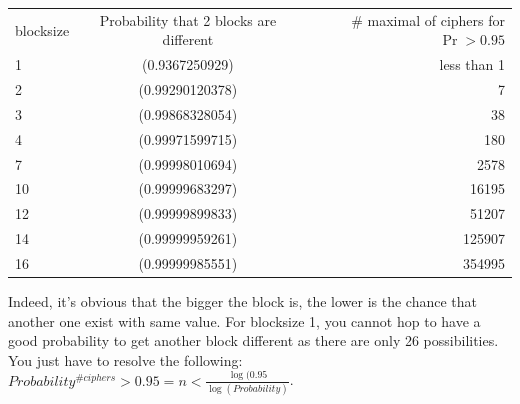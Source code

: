 \documentclass{article}
\begin{document}
\begin{tabular}{|l|c|r|}
  \hline
  blocksize & Probability that 2 blocks are different & \# maximal of ciphers for $\Pr > 0.95$\\
	1 & (0.9367250929) & less than 1\\
	2 & (0.99290120378) & 7\\
	3 & (0.99868328054) & 38\\
	4 & (0.99971599715) & 180\\
	7 & (0.99998010694) & 2578\\
	10 & (0.99999683297) & 16195\\
	12 & (0.99999899833) & 51207\\
	14 & (0.99999959261) & 125907\\
	16 & (0.99999985551) & 354995\\
	\hline
\end{tabular}

Indeed, it's obvious that the bigger the block is, the lower is the chance that another one exist with same value. For blocksize 1, you cannot hop to have a good probability to get another block different as there are only 26 possibilities. You just have to resolve the following:$Probability^{\#ciphers}>0.95 = n < \frac{\log(0.95}{\log(Probability)}$.
\appendix
\newpage
\end{document}
